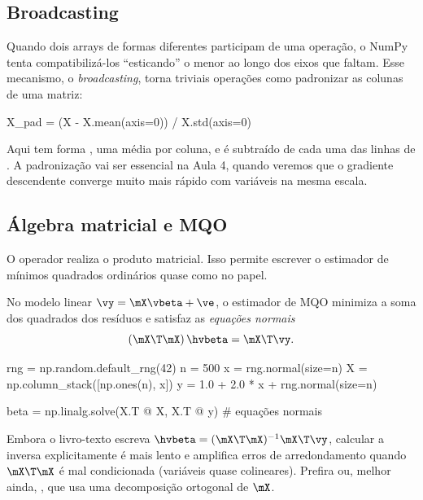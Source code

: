 {\subsection{Broadcasting}

Quando dois arrays de formas diferentes participam de uma operação, o NumPy
tenta compatibilizá-los ``esticando'' o menor ao longo dos eixos que faltam.
Esse mecanismo, o \emph{broadcasting}, torna triviais operações como padronizar
as colunas de uma matriz:

\begin{codigo}
X_pad = (X - X.mean(axis=0)) / X.std(axis=0)
\end{codigo}

Aqui  tem forma , uma média por coluna, e é
subtraído de cada uma das linhas de . A padronização vai ser essencial
na Aula 4, quando veremos que o gradiente descendente converge muito mais rápido
com variáveis na mesma escala.

\subsection{Álgebra matricial e MQO}

O operador  realiza o produto matricial. Isso permite escrever o
estimador de mínimos quadrados ordinários quase como no papel.

\begin{conexao}
No modelo linear $\vy = \mX\vbeta + \ve$, o estimador de MQO minimiza a soma
dos quadrados dos resíduos e satisfaz as \emph{equações normais}
\begin{equation}\label{eq:a01-normais}
  (\mX\T\mX)\,\hvbeta = \mX\T\vy .
\end{equation}
\end{conexao}

\begin{codigo}
rng = np.random.default_rng(42)
n = 500
x = rng.normal(size=n)
X = np.column_stack([np.ones(n), x])
y = 1.0 + 2.0 * x + rng.normal(size=n)

beta = np.linalg.solve(X.T @ X, X.T @ y)    # equações normais
\end{codigo}

\begin{atencao}
Embora o livro-texto escreva $\hvbeta = (\mX\T\mX)^{-1}\mX\T\vy$, calcular a
inversa explicitamente é mais lento e amplifica erros de arredondamento quando
$\mX\T\mX$ é mal condicionada (variáveis quase colineares). Prefira
 ou, melhor ainda, , que usa uma
decomposição ortogonal de $\mX$.
\end{atencao}

}
